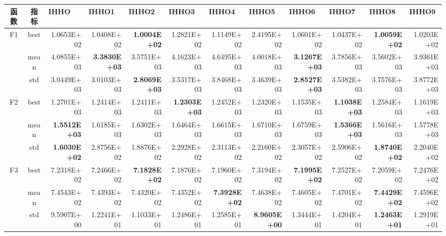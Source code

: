 \documentclass{wzuthesis}
\begin{document}
\begin{landscape}
    \begin{table}[htbp]
  \centering
  \footnotesize
  \label{tab:IHHO-sensitivity-exp}%
    \begin{tabular}{ccrrrrrrrrrr}
        \toprule
    函数    & 指标    & \multicolumn{1}{l}{IHHO} & \multicolumn{1}{l}{IHHO1} & \multicolumn{1}{l}{IHHO2} & \multicolumn{1}{l}{IHHO3} & \multicolumn{1}{l}{IHHO4} & \multicolumn{1}{l}{IHHO5} & \multicolumn{1}{l}{IHHO6} & \multicolumn{1}{l}{IHHO7} & \multicolumn{1}{l}{IHHO8} & \multicolumn{1}{l}{IHHO9} \\
    \midrule
    \multirow{3}[0]{*}{F1} & best  & 1.0653E+02 & 1.0408E+02 & \textbf{1.0004E+02} & 1.2821E+02 & 1.1149E+02 & 2.4195E+02 & 1.0601E+02 & 1.0437E+02 & \textbf{1.0059E+02} & 1.0203E+02 \\
          & mean  & 4.0855E+03 & \textbf{3.3830E+03} & 3.5751E+03 & 4.1623E+03 & 4.6495E+03 & 4.0018E+03 & \textbf{3.1267E+03} & 3.7856E+03 & 3.5602E+03 & 3.9361E+03 \\
          & std   & 3.0449E+03 & 3.0103E+03 & \textbf{2.8069E+03} & 3.5317E+03 & 3.8468E+03 & 3.4639E+03 & \textbf{2.8527E+03} & 3.5382E+03 & 3.7576E+03 & 3.8772E+03 \\
    \multirow{3}[0]{*}{F2} & best  & 1.2701E+03 & 1.2414E+03 & 1.2411E+03 & \textbf{1.2303E+03} & 1.2452E+03 & 1.2320E+03 & 1.1535E+03 & \textbf{1.1038E+03} & 1.2584E+03 & 1.1619E+03 \\
          & mean  & \textbf{1.5512E+03} & 1.6185E+03 & 1.6302E+03 & 1.6464E+03 & 1.6615E+03 & 1.6710E+03 & 1.6759E+03 & \textbf{1.5366E+03} & 1.5616E+03 & 1.5778E+03 \\
          & std   & \textbf{1.6030E+02} & 2.8756E+02 & 1.8876E+02 & 2.2928E+02 & 2.3113E+02 & 2.2160E+02 & 2.3057E+02 & 2.5906E+02 & \textbf{1.8740E+02} & 2.2040E+02 \\
    \multirow{3}[0]{*}{F3} & best  & 7.2318E+02 & 7.2466E+02 & \textbf{7.1828E+02} & 7.1876E+02 & 7.1960E+02 & 7.3194E+02 & \textbf{7.1995E+02} & 7.2527E+02 & 7.2059E+02 & 7.2476E+02 \\
          & mean  & 7.4543E+02 & 7.4393E+02 & 7.4320E+02 & 7.4352E+02 & \textbf{7.3928E+02} & 7.4638E+02 & 7.4605E+02 & 7.4701E+02 & \textbf{7.4429E+02} & 7.4596E+02 \\
          & std   & 9.5907E+00 & 1.2241E+01 & 1.1033E+01 & 1.2486E+01 & 1.2585E+01 & \textbf{8.9605E+00} & 1.3444E+01 & 1.4204E+01 & \textbf{1.2463E+01} & 1.2919E+01 \\

\end{tabular}
\end{table}
\end{landscape}
\end{document}
